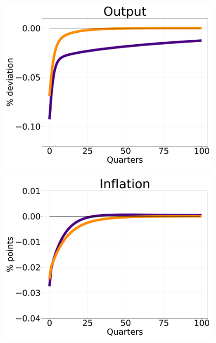 \begin{figure}[!h]
\begin{minipage}{0.33\textwidth}
  \includegraphics[scale=.14]{text/chapter1/Figures/IPRs_discfac/Y_IPR}
  \label{fig:3}
\end{minipage}
\begin{minipage}{0.33\textwidth}
  \includegraphics[scale=.14]{text/chapter1/Figures/IPRs_discfac/pi_IPR}
  \label{fig:4}
\end{minipage}
\medskip
\begin{minipage}{0.33\textwidth}

\end{minipage}
\end{figure}
